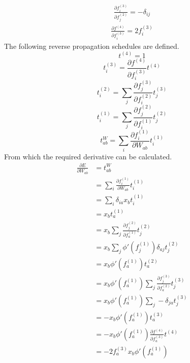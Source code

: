 \documentclass[fleqn]{article}
\begin{document}
\begin{equation}
    \begin{split}
        \frac{\partial f^{(3)}_i}{\partial f^{(2)}_j} = - \delta_{ij}
    \end{split}
\end{equation}
\begin{equation}
    \begin{split}
        \frac{\partial f^{(4)}}{\partial f^{(3)}_i} = 2 f^{(3)}_i
    \end{split}
\end{equation}
The following reverse propagation schedules are defined.
\begin{equation}
    t^{(4)} = 1
\end{equation}
\begin{equation}
    t^{(3)}_i = \frac{\partial f^{(4)}}{\partial f^{(3)}_i} t^{(4)}
\end{equation}
\begin{equation}
    t^{(2)}_i = \sum_j \frac{\partial f^{(3)}_j}{\partial f^{(2)}_i} t^{(3)}_j
\end{equation}
\begin{equation}
    t^{(1)}_i = \sum_j \frac{\partial f^{(2)}_j}{\partial f^{(1)}_i} t^{(2)}_j
\end{equation}
\begin{equation}
    t^{W}_{ab} = \sum_i \frac{\partial f^{(1)}_i}{\partial W_{ab}} t^{(1)}_i
\end{equation}
From which the required derivative can be calculated.
\begin{equation}
    \begin{split}
        \frac{\partial E}{\partial W_{ab}} & = t^{W}_{ab} \\
        & = \sum_i \frac{\partial f^{(1)}_i}{\partial W_{ab}} t^{(1)}_i \\
        & = \sum_i \delta_{ia} x_b t^{(1)}_i \\
        & = x_b t^{(1)}_a \\
        & = x_b \sum_j \frac{\partial f^{(2)}_j}{\partial f^{(1)}_a} t^{(2)}_j \\
        & = x_b \sum_j \phi'(f^{(1)}_j) \delta_{aj} t^{(2)}_j \\
        & = x_b \phi'(f^{(1)}_a) t^{(2)}_a \\
        & = x_b \phi'(f^{(1)}_a) \sum_j \frac{\partial f^{(3)}_j}{\partial f^{(2)}_a} t^{(3)}_j \\
        & = x_b \phi'(f^{(1)}_a) \sum_j - \delta_{ja} t^{(3)}_j \\
        & = - x_b \phi'(f^{(1)}_a) t^{(3)}_a \\
        & = - x_b \phi'(f^{(1)}_a) \frac{\partial f^{(4)}}{\partial f^{(3)}_a} t^{(4)} \\
        & = - 2 f^{(3)}_a x_b \phi'(f^{(1)}_a) \\
    \end{split}
\end{equation}
\end{document}
